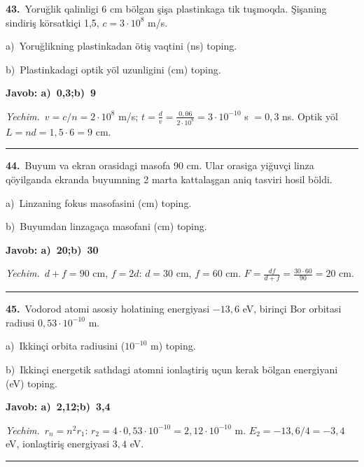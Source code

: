 \documentclass[11pt,a4paper]{article}
\begin{document}
\noindent\textbf{43.}\ Yoruğlik qalinligi 6 cm bölgan şişa plastinkaga tik tuşmoqda. Şişaning sindiriş körsatkiçi 1,5, $c=3\cdot10^8$ m/s.\par
\noindent\hspace*{4mm}a)\ Yoruğlikning plastinkadan ötiş vaqtini (ns) toping.\par
\noindent\hspace*{4mm}b)\ Plastinkadagi optik yöl uzunligini (cm) toping.\par
\noindent\colorbox{gray!12}{\parbox{\dimexpr\linewidth-2\fboxsep}{\textbf{Javob: a)\ 0,3;\quad b)\ 9}}}\par\smallskip
\noindent\textit{Yechim.}\ $v=c/n=2\cdot10^8$ m/s; $t=\frac{d}{v}=\frac{0{,}06}{2\cdot10^8}=3\cdot10^{-10}$ s $=0{,}3$ ns. Optik yöl $L=nd=1{,}5\cdot6=9$ cm.\par\par\medskip\hrule\medskip
{}\noindent\textbf{44.}\ Buyum va ekran orasidagi masofa 90 cm. Ular orasiga yiğuvçi linza qöyilganda ekranda buyumning 2 marta kattalaşgan aniq tasviri hosil böldi.\par
\noindent\hspace*{4mm}a)\ Linzaning fokus masofasini (cm) toping.\par
\noindent\hspace*{4mm}b)\ Buyumdan linzagaça masofani (cm) toping.\par
\noindent\colorbox{gray!12}{\parbox{\dimexpr\linewidth-2\fboxsep}{\textbf{Javob: a)\ 20;\quad b)\ 30}}}\par\smallskip
\noindent\textit{Yechim.}\ $d+f=90$ cm, $f=2d$: $d=30$ cm, $f=60$ cm. $F=\frac{df}{d+f}=\frac{30\cdot60}{90}=20$ cm.\par\par\medskip\hrule\medskip
{}\noindent\textbf{45.}\ Vodorod atomi asosiy holatining energiyasi $-13{,}6$ eV, birinçi Bor orbitasi radiusi $0{,}53\cdot10^{-10}$ m.\par
\noindent\hspace*{4mm}a)\ Ikkinçi orbita radiusini ($10^{-10}$ m) toping.\par
\noindent\hspace*{4mm}b)\ Ikkinçi energetik sathdagi atomni ionlaştiriş uçun kerak bölgan energiyani (eV) toping.\par
\noindent\colorbox{gray!12}{\parbox{\dimexpr\linewidth-2\fboxsep}{\textbf{Javob: a)\ 2,12;\quad b)\ 3,4}}}\par\smallskip
\noindent\textit{Yechim.}\ $r_n=n^2r_1$: $r_2=4\cdot0{,}53\cdot10^{-10}=2{,}12\cdot10^{-10}$ m. $E_2=-13{,}6/4=-3{,}4$ eV, ionlaştiriş energiyasi $3{,}4$ eV.\par\par\medskip\hrule\medskip
\end{document}
